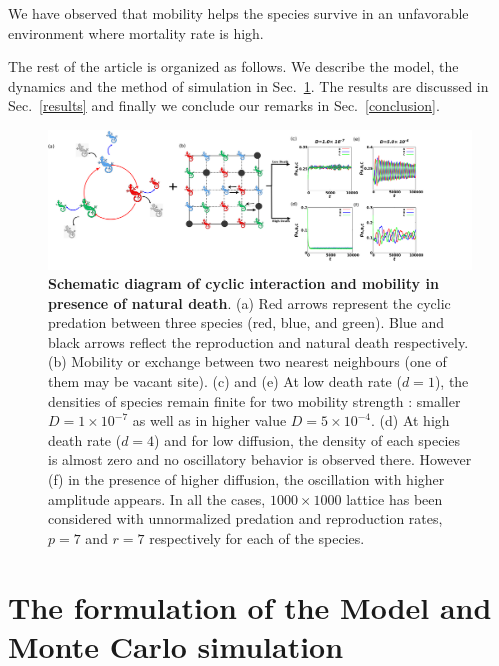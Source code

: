 \documentclass[aps, pre, twocolumn, amsmath, superscriptaddress,showkeys,showpacs]{revtex4-1}
\begin{document}
	{We have observed that mobility helps the species survive in an unfavorable environment where mortality rate is high.}  %
	\par {The rest of the article is organized as follows. We describe the model, the dynamics and the method of simulation in Sec.~\ref{simulation}. The results are discussed in Sec.~\ref{results} and finally we conclude our remarks  in Sec.~\ref{conclusion}.}
	\begin{figure}[ht!]
	\centering
	\includegraphics[width=1.1\textwidth]{Diagram1.png}
	\caption{{\bf Schematic diagram of cyclic interaction and mobility in presence of natural death}. (a) Red arrows represent the cyclic predation between three species (red, blue, and green). Blue and black arrows reflect the reproduction  and natural death respectively. (b) Mobility or exchange between two nearest neighbours (one of them may be vacant site). (c) and (e) At low death rate ($d=1$), the densities of species remain finite for two mobility strength : smaller  $D=1\times 10^{-7}$  as well as in higher value $D=5\times 10^{-4}$. (d) At high death rate ($d=4$)  and for low diffusion, the density of each species is almost zero and no oscillatory behavior is observed there. However  (f) in the presence of higher diffusion, the oscillation with higher amplitude appears. In all the cases, $1000\times 1000$ lattice has been considered with unnormalized predation and reproduction rates, $p=7$ and $r=7$ respectively for each of the species.}
	\label{fig1}
\end{figure}	
	
	
	\section{The formulation of the Model and  Monte Carlo simulation}
	\label{simulation}
	
\end{document}
